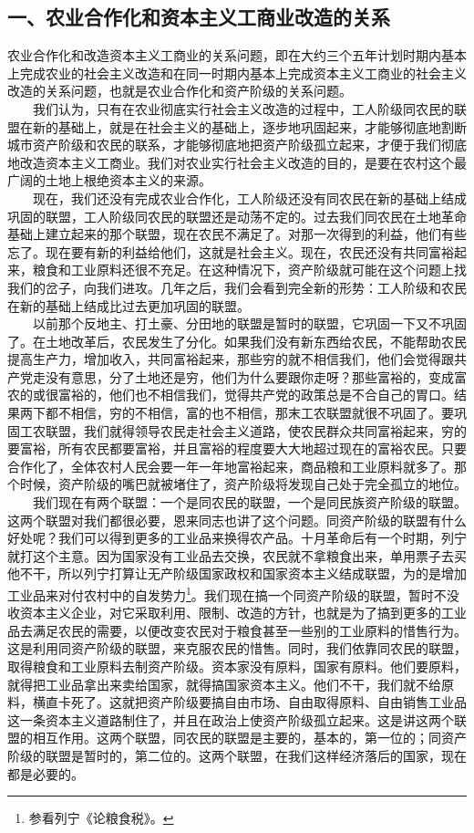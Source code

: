 \documentclass[cn,11pt,chinese]{elegantbook}
\def\myformat#1{\hfil\hfil #1}
\begin{document}
\subsection*{\myformat{一、农业合作化和资本主义工商业改造的关系}}
农业合作化和改造资本主义工商业的关系问题，即在大约三个五年计划时期内基本上完成农业的社会主义改造和在同一时期内基本上完成资本主义工商业的社会主义改造的关系问题，也就是农业合作化和资产阶级的关系问题。\\
　　我们认为，只有在农业彻底实行社会主义改造的过程中，工人阶级同农民的联盟在新的基础上，就是在社会主义的基础上，逐步地巩固起来，才能够彻底地割断城市资产阶级和农民的联系，才能够彻底地把资产阶级孤立起来，才便于我们彻底地改造资本主义工商业。我们对农业实行社会主义改造的目的，是要在农村这个最广阔的土地上根绝资本主义的来源。\\
　　现在，我们还没有完成农业合作化，工人阶级还没有同农民在新的基础上结成巩固的联盟，工人阶级同农民的联盟还是动荡不定的。过去我们同农民在土地革命基础上建立起来的那个联盟，现在农民不满足了。对那一次得到的利益，他们有些忘了。现在要有新的利益给他们，这就是社会主义。现在，农民还没有共同富裕起来，粮食和工业原料还很不充足。在这种情况下，资产阶级就可能在这个问题上找我们的岔子，向我们进攻。几年之后，我们会看到完全新的形势：工人阶级和农民在新的基础上结成比过去更加巩固的联盟。\\
　　以前那个反地主、打土豪、分田地的联盟是暂时的联盟，它巩固一下又不巩固了。在土地改革后，农民发生了分化。如果我们没有新东西给农民，不能帮助农民提高生产力，增加收入，共同富裕起来，那些穷的就不相信我们，他们会觉得跟共产党走没有意思，分了土地还是穷，他们为什么要跟你走呀？那些富裕的，变成富农的或很富裕的，他们也不相信我们，觉得共产党的政策总是不合自己的胃口。结果两下都不相信，穷的不相信，富的也不相信，那末工农联盟就很不巩固了。要巩固工农联盟，我们就得领导农民走社会主义道路，使农民群众共同富裕起来，穷的要富裕，所有农民都要富裕，并且富裕的程度要大大地超过现在的富裕农民。只要合作化了，全体农村人民会要一年一年地富裕起来，商品粮和工业原料就多了。那个时候，资产阶级的嘴巴就被堵住了，资产阶级将发现自己处于完全孤立的地位。\\
　　我们现在有两个联盟：一个是同农民的联盟，一个是同民族资产阶级的联盟。这两个联盟对我们都很必要，恩来同志也讲了这个问题。同资产阶级的联盟有什么好处呢？我们可以得到更多的工业品来换得农产品。十月革命后有一个时期，列宁就打这个主意。因为国家没有工业品去交换，农民就不拿粮食出来，单用票子去买他不干，所以列宁打算让无产阶级国家政权和国家资本主义结成联盟，为的是增加工业品来对付农村中的自发势力\footnote[1]{参看列宁《论粮食税》。}。我们现在搞一个同资产阶级的联盟，暂时不没收资本主义企业，对它采取利用、限制、改造的方针，也就是为了搞到更多的工业品去满足农民的需要，以便改变农民对于粮食甚至一些别的工业原料的惜售行为。这是利用同资产阶级的联盟，来克服农民的惜售。同时，我们依靠同农民的联盟，取得粮食和工业原料去制资产阶级。资本家没有原料，国家有原料。他们要原料，就得把工业品拿出来卖给国家，就得搞国家资本主义。他们不干，我们就不给原料，横直卡死了。这就把资产阶级要搞自由市场、自由取得原料、自由销售工业品这一条资本主义道路制住了，并且在政治上使资产阶级孤立起来。这是讲这两个联盟的相互作用。这两个联盟，同农民的联盟是主要的，基本的，第一位的；同资产阶级的联盟是暂时的，第二位的。这两个联盟，在我们这样经济落后的国家，现在都是必要的。\\
\end{document}
